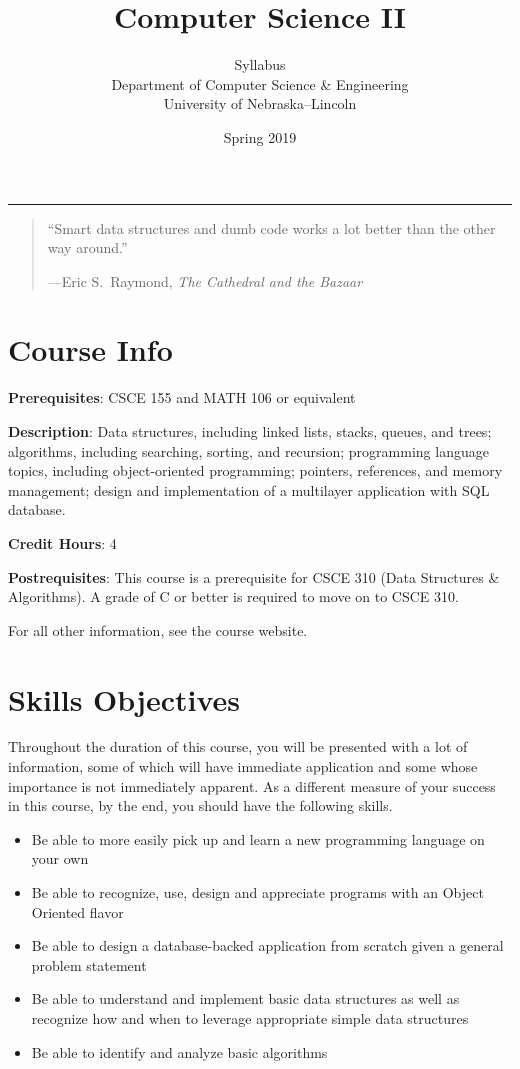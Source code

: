 \documentclass[12pt]{scrartcl}
\title{Computer Science II}\let\Title\@title
\subtitle{Syllabus\\
{\small
\vskip1cm
Department of Computer Science \& Engineering \\
University of Nebraska--Lincoln}
\vskip-1cm}
\date{Spring 2019}
\begin{document}
\maketitle


\hrule

\begin{quote}
``Smart data structures and dumb code works a lot better than the other way around.'' 

\hfill ---Eric S.\ Raymond, \emph{The Cathedral and the Bazaar}
\end{quote}

\section{Course Info}

\textbf{Prerequisites}: CSCE 155 and MATH 106 or equivalent

\textbf{Description}: Data structures, including linked lists, stacks, 
queues, and trees; algorithms, including searching, sorting, and 
recursion; programming language topics, including object-oriented 
programming; pointers, references, and memory management; design and 
implementation of a multilayer application with SQL database.

\textbf{Credit Hours}: 4

\textbf{Postrequisites}: This course is a prerequisite for CSCE 310
(Data Structures \& Algorithms).  A grade of C or better is required 
to move on to CSCE 310.

For all other information, see the course website.

\section{Skills Objectives}

Throughout the duration of this course, you will be presented 
with a lot of information, some of which will have immediate 
application and some whose importance is not immediately apparent.  
As a different measure of your success in this course, by the end, 
you should have the following skills.

\begin{itemize}
  \item Be able to more easily pick up and learn a new programming 
  language on your own
  \item Be able to recognize, use, design and appreciate programs 
  with an Object Oriented flavor
  \item Be able to design a database-backed application from scratch 
  given a general problem statement
  \item Be able to understand and implement basic data structures 
  as well as recognize how and when to leverage appropriate simple 
  data structures
  \item Be able to identify and analyze basic algorithms
\end{itemize}
\end{document}
